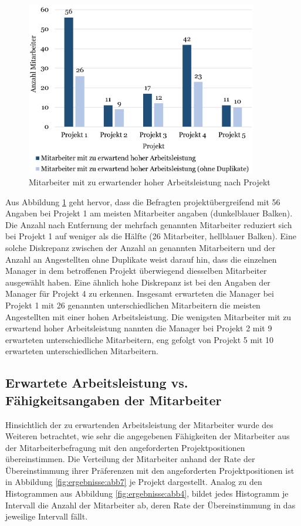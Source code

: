 \begin{figure}
    \centering
	\includegraphics[width=0.9\textwidth]{gfx/verteilung-m-prod.png}
	\caption[Mitarbeiter mit zu erwartender hoher Arbeitsleistung nach Projekt]{Mitarbeiter mit zu erwartender hoher Arbeitsleistung nach Projekt}
	\label{fig:ergebnisse:abb5}
\end{figure}

Aus Abbildung \ref{fig:ergebnisse:abb5} geht hervor, dass die Befragten projektübergreifend mit 56 Angaben bei Projekt 1 am meisten Mitarbeiter angaben (dunkelblauer Balken).
Die Anzahl nach Entfernung der mehrfach genannten Mitarbeiter reduziert sich bei Projekt 1 auf weniger als die Hälfte (26 Mitarbeiter, hellblauer Balken).
Eine solche Diskrepanz zwischen der Anzahl an genannten Mitarbeitern und der Anzahl an Angestellten ohne Duplikate weist darauf hin, dass die einzelnen Manager in dem betroffenen Projekt überwiegend diesselben Mitarbeiter ausgewählt haben.
Eine ähnlich hohe Diskrepanz ist bei den Angaben der Manager für Projekt 4 zu erkennen.
Insgesamt erwarteten die Manager bei Projekt 1 mit 26 genannten unterschiedlichen Mitarbeitern die meisten Angestellten mit einer hohen Arbeitsleistung.
Die wenigsten Mitarbeiter mit zu erwartend hoher Arbeitsleistung nannten die Manager bei Projekt 2 mit 9 erwarteten unterschiedliche Mitarbeitern, eng gefolgt von Projekt 5 mit 10 erwarteten unterschiedlichen Mitarbeitern.

\subsection{Erwartete Arbeitsleistung vs. Fähigkeitsangaben der Mitarbeiter}
Hinsichtlich der zu erwartenden Arbeitsleistung der Mitarbeiter wurde des Weiteren betrachtet, wie sehr die angegebenen Fähigkeiten der Mitarbeiter aus der Mitarbeiterbefragung mit den angeforderten Projektpositionen übereinstimmen.
Die Verteilung der Mitarbeiter anhand der Rate der Übereinstimmung ihrer Präferenzen mit den angeforderten Projektpositionen ist in Abbildung \ref{fig:ergebnisse:abb7} je Projekt dargestellt.
Analog zu den Histogrammen aus Abbildung \ref{fig:ergebnisse:abb4}, bildet jedes Histogramm je Intervall die Anzahl der Mitarbeiter ab, deren Rate der Übereinstimmung in das jeweilige Intervall fällt.

